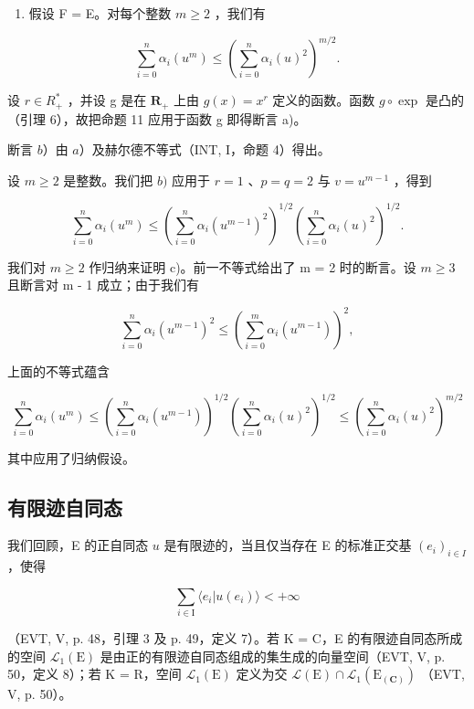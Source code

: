\begin{enumerate}
\def\labelenumi{\alph{enumi})}
\setcounter{enumi}{2}
\tightlist
\item
  假设 F = E。对每个整数 \(m \geqslant 2\) ，我们有
\end{enumerate}

\[
\sum_ {i = 0} ^ {n} \alpha_ {i} (u ^ {m}) \leqslant \left(\sum_ {i = 0} ^ {n} \alpha_ {i} (u) ^ {2}\right) ^ {m / 2}.
\]

设 \(r \in R_{+}^{*}\) ，并设 g 是在 \(\mathbf{R}_{+}\) 上由 \(g(x) = x^{r}\) 定义的函数。函数 \(g \circ \exp\) 是凸的（引理 6），故把命题 11 应用于函数 g 即得断言 a)。

断言 \(b\)）由 \(a\)）及赫尔德不等式（INT, I，命题 4）得出。

设 \(m \geqslant 2\) 是整数。我们把 \(b)\) 应用于 \(r = 1\) 、\(p = q = 2\) 与 \(v = u^{m-1}\) ，得到

\[
\sum_ {i = 0} ^ {n} \alpha_ {i} (u ^ {m}) \leqslant \left(\sum_ {i = 0} ^ {n} \alpha_ {i} (u ^ {m - 1}) ^ {2}\right) ^ {1 / 2} \left(\sum_ {i = 0} ^ {n} \alpha_ {i} (u) ^ {2}\right) ^ {1 / 2}.
\]

我们对 \(m \geqslant 2\) 作归纳来证明 c)。前一不等式给出了 m = 2 时的断言。设 \(m \geqslant 3\) 且断言对 m - 1 成立；由于我们有

\[
\sum_ {i = 0} ^ {n} \alpha_ {i} (u ^ {m - 1}) ^ {2} \leqslant \left(\sum_ {i = 0} ^ {m} \alpha_ {i} (u ^ {m - 1})\right) ^ {2},
\]

上面的不等式蕴含

\[
\sum_ {i = 0} ^ {n} \alpha_ {i} (u ^ {m}) \leqslant \left(\sum_ {i = 0} ^ {n} \alpha_ {i} (u ^ {m - 1})\right) ^ {1 / 2} \left(\sum_ {i = 0} ^ {n} \alpha_ {i} (u) ^ {2}\right) ^ {1 / 2} \leqslant \left(\sum_ {i = 0} ^ {n} \alpha_ {i} (u) ^ {2}\right) ^ {m / 2}
\]

其中应用了归纳假设。

\subsection{有限迹自同态}

我们回顾，E 的正自同态 \(u\) 是有限迹的，当且仅当存在 E 的标准正交基 \((e_i)_{i \in I}\) ，使得

\[
\sum_ {i \in \mathrm{I}} \langle e _ {i} | u (e _ {i}) \rangle <   + \infty
\]

（EVT, V, p. 48，引理 3 及 p. 49，定义 7）。若 K = C，E 的有限迹自同态所成的空间 \(\mathcal{L}_1(\mathrm{E})\) 是由正的有限迹自同态组成的集生成的向量空间（EVT, V, p. 50，定义 8）；若 K = R，空间 \(\mathcal{L}_1(\mathrm{E})\) 定义为交 \(\mathcal{L}(\mathrm{E}) \cap \mathcal{L}_1(\mathrm{E}_{(\mathbf{C})})\) （EVT, V, p. 50）。

